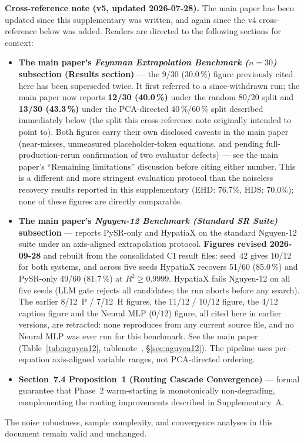 \documentclass[twoside,11pt]{article}
\newcommand{\Rsq}{R^{2}}
\begin{document}
\medskip
\noindent\textbf{Cross-reference note (v5, updated 2026-07-28).}
The main paper has been updated since this supplementary was written, and
again since the v4 cross-reference below was added. Readers are directed
to the following sections for context:
\begin{itemize}
  \item \textbf{The main paper's \emph{Feynman Extrapolation Benchmark ($n=30$)} subsection (Results section)} --- the
    9/30 (30.0\,\%) figure previously cited here has been superseded twice.
    It first referred to a since-withdrawn run; the main paper now reports
    \textbf{12/30 (40.0\,\%)} under the random 80/20 split and
    \textbf{13/30 (43.3\,\%)} under the PCA-directed 40\,\%/60\,\% split
    described immediately below (the split this cross-reference note
    originally intended to point to). Both figures carry their own
    disclosed caveats in the main paper (near-misses, unmeasured
    placeholder-token equations, and pending full-production-rerun
    confirmation of two evaluator defects) --- see the main paper's
    ``Remaining limitations'' discussion before citing either number.
    This is a different and more stringent evaluation protocol
    than the noiseless recovery results reported in this supplementary
    (EHD: 76.7\%, HDS: 70.0\%); none of these figures are directly comparable.
  \item \textbf{The main paper's \emph{Nguyen-12 Benchmark (Standard SR Suite)} subsection} --- reports
    PySR-only and HypatiaX on the standard Nguyen-12 suite under an axis-aligned
    extrapolation protocol. \textbf{Figures revised 2026-09-28} and rebuilt from
    the consolidated CI result files: seed~42 gives 10/12 for both systems, and
    across five seeds HypatiaX recovers 51/60 (85.0\,\%) and PySR-only 49/60
    (81.7\,\%) at $\Rsq\ge0.9999$. HypatiaX fails Nguyen-12 on all five seeds
    (LLM gate rejects all candidates; the run aborts before any search).
    The earlier 8/12~P / 7/12~H figures, the 11/12 / 10/12 figure, the
    4/12 caption figure and the Neural MLP (0/12) figure, all cited here in
    earlier versions, are retracted: none reproduces from any current source
    file, and no Neural MLP was ever run for this benchmark. See the main paper
    (Table~\ref{tab:nguyen12}, tablenote~\ddag, \S\ref{sec:nguyen12}). The
    pipeline uses per-equation axis-aligned variable ranges, not PCA-directed
    ordering.
  \item \textbf{Section~7.4 Proposition~1 (Routing Cascade Convergence)} --- formal
    guarantee that Phase~2 warm-starting is monotonically non-degrading,
    complementing the routing improvements described in Supplementary~A.
\end{itemize}
The noise robustness, sample complexity, and convergence analyses in this
document remain valid and unchanged.
\end{document}
